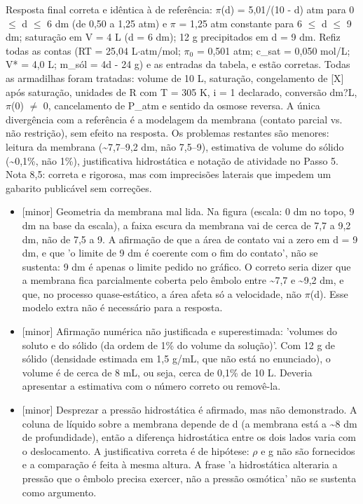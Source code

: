 \documentclass{article}%
\begin{document}
Resposta final correta e idêntica à de referência: $\pi$(d) = 5,01/(10 - d) atm para 0 $\leq$ d $\leq$ 6 dm (de 0,50 a 1,25 atm) e $\pi$ = 1,25 atm constante para 6 $\leq$ d $\leq$ 9 dm; saturação em V = 4 L (d = 6 dm); 12 g precipitados em d = 9 dm. Refiz todas as contas (RT = 25,04 L$\cdot$atm/mol; $\pi$$_{0}$ = 0,501 atm; c\_sat = 0,050 mol/L; V* = 4,0 L; m\_sól = 4d - 24 g) e as entradas da tabela, e estão corretas. Todas as armadilhas foram tratadas: volume de 10 L, saturação, congelamento de {[}X{]} após saturação, unidades de R com T = 305 K, i = 1 declarado, conversão dm?L, $\pi$(0) $\neq$ 0, cancelamento de P\_atm e sentido da osmose reversa. A única divergência com a referência é a modelagem da membrana (contato parcial vs. não restrição), sem efeito na resposta. Os problemas restantes são menores: leitura da membrana (\textasciitilde{}7,7--9,2 dm, não 7,5--9), estimativa de volume do sólido (\textasciitilde{}0,1\%, não 1\%), justificativa hidrostática e notação de atividade no Passo 5. Nota 8,5: correta e rigorosa, mas com imprecisões laterais que impedem um gabarito publicável sem correções.%
\begin{itemize}%
\item%
{[}minor{]} Geometria da membrana mal lida. Na figura (escala: 0 dm no topo, 9 dm na base da escala), a faixa escura da membrana vai de cerca de 7,7 a 9,2 dm, não de 7,5 a 9. A afirmação de que a área de contato vai a zero em d = 9 dm, e que 'o limite de 9 dm é coerente com o fim do contato', não se sustenta: 9 dm é apenas o limite pedido no gráfico. O correto seria dizer que a membrana fica parcialmente coberta pelo êmbolo entre \textasciitilde{}7,7 e \textasciitilde{}9,2 dm, e que, no processo quase{-}estático, a área afeta só a velocidade, não $\pi$(d). Esse modelo extra não é necessário para a resposta.%
\item%
{[}minor{]} Afirmação numérica não justificada e superestimada: 'volumes do soluto e do sólido (da ordem de 1\% do volume da solução)'. Com 12 g de sólido (densidade estimada em 1,5 g/mL, que não está no enunciado), o volume é de cerca de 8 mL, ou seja, cerca de 0,1\% de 10 L. Deveria apresentar a estimativa com o número correto ou removê{-}la.%
\item%
{[}minor{]} Desprezar a pressão hidrostática é afirmado, mas não demonstrado. A coluna de líquido sobre a membrana depende de d (a membrana está a \textasciitilde{}8 dm de profundidade), então a diferença hidrostática entre os dois lados varia com o deslocamento. A justificativa correta é de hipótese: $\rho$ e g não são fornecidos e a comparação é feita à mesma altura. A frase 'a hidrostática alteraria a pressão que o êmbolo precisa exercer, não a pressão osmótica' não se sustenta como argumento.%

\end{itemize}$$
\end{document}

